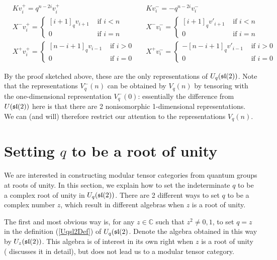 \begin{align*}
    &K v^+_i = q^{n-2i} v^+_i  &
    &K v^-_i = -q^{n-2i} v^-_i \\
    &X^- v^+_i = \begin{cases} [i+1]_qv_{i+1}& \text{ if $i < n$} \\ 0& \text{ if $i = n$} \end{cases} &
    &X^- v^-_i = \begin{cases} [i+1]_qv'_{i+1}& \text{ if $i < n$} \\ 0& \text{ if $i = n$} \end{cases} \\
    & X^+  v^+_i = \begin{cases} 
                     [n-i+1]_qv_{i-1}& \text{ if $i > 0$} \\ 
                    0& \text{ if $i = 0$} 
             \end{cases} &
    & X^+  v^-_i = \begin{cases} 
                    -[n-i+1]_q v'_{i-1}& \text{ if $i > 0$} \\ 
                    0& \text{ if $i = 0$} 
             \end{cases}
\end{align*}

By the proof sketched above, these are the only representations of
$U_q(\mathfrak{sl}(2))$.  Note that the representations $V_q^-(n)$ can be obtained by
$V_q(n)$ by tensoring with the one-dimensional representation $V_q^-(0)$:
essentially the difference from $U(\mathfrak{sl}(2))$ here is that there are 2
nonisomorphic 1-dimensional representations. We can (and will) therefore
restrict our attention to the representations $V_q(n)$.

\section{Setting $q$ to be a root of unity}

We are interested in constructing modular tensor categories from quantum groups at roots of unity. In this section, we explain how to set the indeterminate $q$ to be a complex root of unity in $U_q(\mathfrak{sl}(2))$. There are 2 different ways to set $q$ to be a complex number $z$, which result in different algebras when $z$ is a root of unity. 

The first and most obvious way is, for any $z \in \mathbb{C}$ such that $z ^2
\neq 0,1$, to set $q = z$ in the definition (\ref{Uqsl2Def}) of $U_q(\mathfrak{sl}(2)$.
Denote the algebra obtained in this way by $U_z(\mathfrak{sl}(2))$. This algebra is of
interest in its own right when $z$ is a root of unity (\cite{Jantzen1995}
discusses it in detail), but does not lead us to a modular tensor category.

